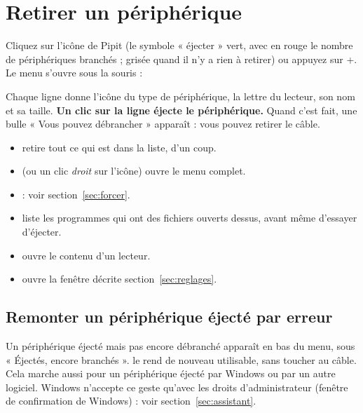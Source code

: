 
\section{Retirer un périphérique}\label{sec:retirer}

Cliquez sur l'icône de Pipit (le symbole « éjecter » vert, avec en rouge le nombre de
périphériques branchés ; grisée quand il n'y a rien à retirer) ou appuyez sur
+. Le menu s'ouvre sous la souris :


Chaque ligne donne l'icône du type de périphérique, la lettre du lecteur, son nom et sa taille. \textbf{Un clic sur la
ligne éjecte le périphérique.} Quand c'est fait, une bulle « Vous pouvez débrancher »
apparaît : vous pouvez retirer le câble.

\begin{itemize}
\item {} retire tout ce qui est dans la liste, d'un coup.
\item {} (ou un clic \emph{droit} sur l'icône) ouvre le menu complet.
\end{itemize}


\begin{itemize}
\item {} : voir section~\ref{sec:forcer}.
\item {} liste les programmes qui ont des fichiers
  ouverts dessus, avant même d'essayer d'éjecter.
\item {} ouvre le contenu d'un lecteur.
\item {} ouvre la fenêtre décrite section~\ref{sec:reglages}.
\end{itemize}

\subsection{Remonter un périphérique éjecté par erreur}
Un périphérique éjecté mais pas encore débranché apparaît en bas du menu, sous
« Éjectés, encore branchés ».  le rend de nouveau utilisable, sans
toucher au câble. Cela marche aussi pour un périphérique éjecté par Windows ou par un
autre logiciel. Windows n'accepte ce geste qu'avec les droits d'administrateur (fenêtre de confirmation de Windows) : voir
section~\ref{sec:assistant}.

